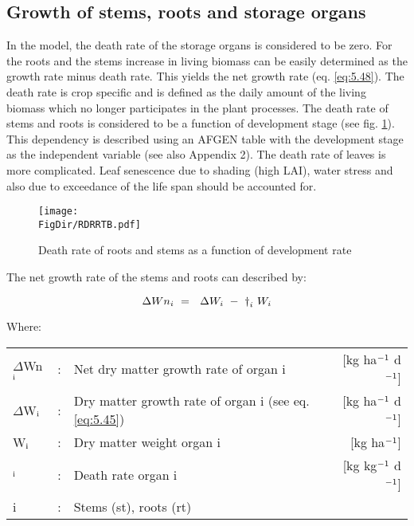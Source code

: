 \subsection{Growth of stems, roots and storage organs}

In the model, the death rate of the storage organs is considered to be zero. For the roots
and the stems increase in living biomass can be easily determined as the growth rate
minus death rate. This yields the net growth rate (eq. \ref{eq:5.48}). The death rate is crop
specific and is defined as the daily amount of the living biomass which no longer
participates in the plant processes. The death rate of stems and roots is considered to be a
function of development stage (see fig. \ref{fig:DeathRoots}). This dependency is described using an
AFGEN table with the development stage as the independent variable (see also Appendix
2). The death rate of leaves is more complicated. Leaf senescence due to shading (high
LAI), water stress and also due to exceedance of the life span should be accounted for.


\begin{figure}[p]
	\centering
	\texttt{[image: \\FigDir/RDRRTB.pdf]}
	\caption{Death rate of roots and stems as a function of development rate}
	\label{fig:DeathRoots}
\end{figure}


The net growth rate of the stems and roots can described by:

\begin{equation}
\label{eq:5.48}
\Delta Wn _{i~} =~\,\,\Delta W _{i~} -~ {\rm \dag } _{i} \,\, W _{i} 
\end{equation}

Where:\\[5pt]
\begin{tabularx}{\textwidth}{llXr}
	$\Delta$Wn$_{{\rm i}}$ &:& Net dry matter growth rate of organ i   &
	[kg ha$^{{\rm -1}}$ d$^{{\rm -1}}$]\\
	$\Delta$W$_{{\rm i}}$ &:& Dry matter growth rate of organ i (see eq. \ref{eq:5.45})   &
	[kg ha$^{{\rm -1}}$ d$^{{\rm -1}}$]\\
	W$_{{\rm i}}$ &:& Dry matter weight organ i  &
	[kg ha$^{{\rm -1}}$]\\
	\dag $_{{\rm i}}$ &:& Death rate organ i   &
	[kg kg$^{{\rm -1}}$ d$^{{\rm -1}}$]\\
	i &:& Stems (st), roots (rt)\\
\end{tabularx}

